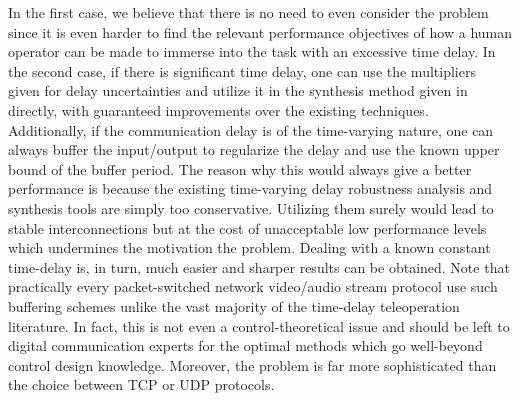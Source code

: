 In the first case, we believe that there is no need to even consider the problem since it is even harder to find the relevant performance 
objectives of how a human operator can be made to immerse into the task with an excessive time delay. In the second case, if there is 
significant time delay, one can use the multipliers given  for delay uncertainties and utilize it in the synthesis 
method given in  directly, with guaranteed improvements over the existing techniques. Additionally, if the communication 
delay is of the time-varying nature, one can always buffer the input/output to regularize the delay and use the known upper bound of the 
buffer period. The reason why this would always give a better performance is because the existing time-varying delay robustness analysis 
and synthesis tools are simply too conservative. Utilizing them surely would lead to stable interconnections but at the cost of unacceptable
low performance levels which undermines the motivation the problem. Dealing with a known constant time-delay is, in turn, much easier and 
sharper results can be obtained. Note that practically every packet-switched network video/audio stream protocol use such buffering schemes 
unlike the vast majority of the time-delay teleoperation literature. In fact, this is not even a control-theoretical issue and should be left 
to digital communication experts for the optimal methods which go well-beyond control design knowledge. Moreover, the problem is far more 
sophisticated than the choice between TCP or UDP protocols. 


